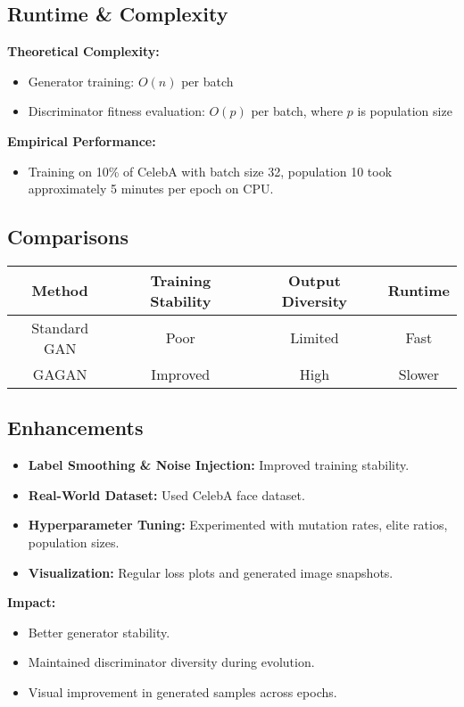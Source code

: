 \documentclass[12pt]{article}
\begin{document}
\subsection{Runtime \& Complexity}
\textbf{Theoretical Complexity:}
\begin{itemize}
    \item Generator training: $O(n)$ per batch
    \item Discriminator fitness evaluation: $O(p)$ per batch, where $p$ is population size
\end{itemize}

\textbf{Empirical Performance:}
\begin{itemize}
    \item Training on 10\% of CelebA with batch size 32, population 10 took approximately 5 minutes per epoch on CPU.
\end{itemize}

\subsection{Comparisons}
\begin{center}
\begin{tabular}{|c|c|c|c|}
\hline
\textbf{Method} & \textbf{Training Stability} & \textbf{Output Diversity} & \textbf{Runtime} \\
\hline
Standard GAN & Poor & Limited & Fast \\
GAGAN        & Improved & High & Slower \\
\hline
\end{tabular}
\end{center}

\subsection{Enhancements}
\begin{itemize}
    \item \textbf{Label Smoothing \& Noise Injection:} Improved training stability.
    \item \textbf{Real-World Dataset:} Used CelebA face dataset.
    \item \textbf{Hyperparameter Tuning:} Experimented with mutation rates, elite ratios, population sizes.
    \item \textbf{Visualization:} Regular loss plots and generated image snapshots.
\end{itemize}

\textbf{Impact:}
\begin{itemize}
    \item Better generator stability.
    \item Maintained discriminator diversity during evolution.
    \item Visual improvement in generated samples across epochs.
\end{itemize}
\end{document}
